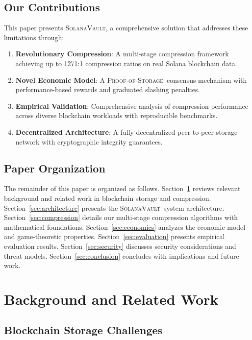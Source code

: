 \documentclass[11pt,a4paper]{article}
\newcommand{\SolanaVault}{\textsc{SolanaVault}}
\newcommand{\ProofOfStorage}{\textsc{Proof-of-Storage}}
\begin{document}
\subsection{Our Contributions}

This paper presents \SolanaVault, a comprehensive solution that addresses these limitations through:

\begin{enumerate}
\item \textbf{Revolutionary Compression}: A multi-stage compression framework achieving up to 1271:1 compression ratios on real Solana blockchain data.
\item \textbf{Novel Economic Model}: A \ProofOfStorage\ consensus mechanism with performance-based rewards and graduated slashing penalties.
\item \textbf{Empirical Validation}: Comprehensive analysis of compression performance across diverse blockchain workloads with reproducible benchmarks.
\item \textbf{Decentralized Architecture}: A fully decentralized peer-to-peer storage network with cryptographic integrity guarantees.
\end{enumerate}

\subsection{Paper Organization}

The remainder of this paper is organized as follows. Section~\ref{sec:background} reviews relevant background and related work in blockchain storage and compression. Section~\ref{sec:architecture} presents the \SolanaVault\ system architecture. Section~\ref{sec:compression} details our multi-stage compression algorithms with mathematical foundations. Section~\ref{sec:economics} analyzes the economic model and game-theoretic properties. Section~\ref{sec:evaluation} presents empirical evaluation results. Section~\ref{sec:security} discusses security considerations and threat models. Section~\ref{sec:conclusion} concludes with implications and future work.

\section{Background and Related Work}
\label{sec:background}

\subsection{Blockchain Storage Challenges}
\end{document}
